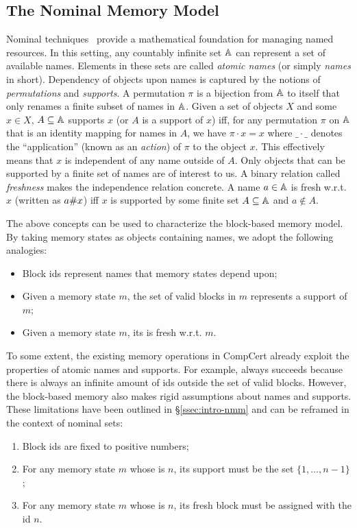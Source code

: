 \subsection{The Nominal Memory Model}
\label{ssec:nominal-nmm}

Nominal techniques~\cite{pitts-nominal,gabby2002} provide a
mathematical foundation for managing named resources. 
%
In this setting, any countably infinite set $\mathbb{A}$ can
represent a set of available names. Elements in these sets are called
\emph{atomic names} (or simply \emph{names} in short). Dependency of
objects upon names is captured by the notions of \emph{permutations}
and \emph{supports}. A permutation $\pi$ is a bijection from
$\mathbb{A}$ to itself that only renames a finite subset of names in
$\mathbb{A}$. Given a set of objects $X$ and some $x \in X$, $A
\subseteq \mathbb{A}$ supports $x$ (or $A$ is a support of $x$) iff,
for any permutation $\pi$ on $\mathbb{A}$ that is an identity mapping
for names in $A$, we have $\pi \cdot x = x$ where $\_ \cdot \_$
denotes the ``application'' (known as an \emph{action}) of $\pi$ to the
object $x$. This effectively means that $x$ is independent of any name
outside of $A$.
%
Only objects that can be supported by a finite set of names are of
interest to us.
%
A binary relation called \emph{freshness} makes the independence
relation concrete. A name $a\in \mathbb{A}$ is fresh w.r.t. $x$
(written as $a \# x$) iff $x$ is supported by some finite set $A
\subseteq \mathbb{A}$ and $a \not\in A$.

The above concepts can be used to characterize the block-based
memory model. By taking memory states as objects containing names, 
we adopt the following analogies:
%
\begin{itemize}\itemsep 0pt
\item Block ids represent names that memory states depend upon;
\item Given a memory state $m$, the set of valid blocks in $m$
  represents a support of $m$;
\item Given a memory state $m$, its \nextblock is fresh w.r.t. $m$.
\end{itemize}
%

To some extent, the
existing memory operations in CompCert already exploit the properties
of atomic names and supports. For example,
 always succeeds because there is always an infinite amount
of ids outside the set of valid blocks.
%
However, 
the block-based memory also makes rigid assumptions
about names and supports.
These limitations have been outlined in \S\ref{ssec:intro-nmm}
and can be reframed in the context of nominal sets:
%
\begin{enumerate} \itemsep 0pt
\item Block ids are fixed to positive numbers;
\item For any memory state $m$ whose \nextblock is $n$, its support
  must be the set $\{1,\ldots,n-1\}$;
\item For any memory state $m$ whose \nextblock is $n$, its fresh
  block must be assigned with the id $n$.
\end{enumerate}

